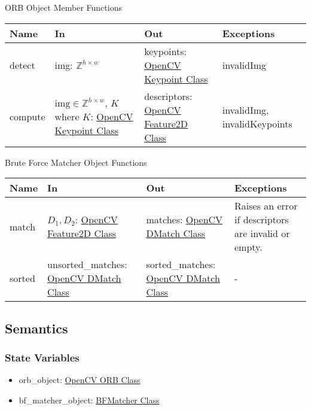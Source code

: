 \documentclass[12pt, titlepage]{article}
\begin{document}
ORB Object Member Functions
\begin{center}
\begin{tabular}{p{4cm} p{4cm} p{5cm} p{3cm}}
\hline
\textbf{Name} & \textbf{In} & \textbf{Out} & \textbf{Exceptions} \\
\hline
detect 
& img: $\mathbb{Z}^{h \times w}$ 
& keypoints: \href{https://docs.opencv.org/3.4/d2/d29/classcv_1_1KeyPoint.html}{OpenCV Keypoint Class} 
& invalidImg \\
\hline
compute & $\text{img} \in \mathbb{Z}^{h \times w}$, \newline 
$K$ where $K$: \href{https://docs.opencv.org/3.4/d2/d29/classcv_1_1KeyPoint.html}{OpenCV Keypoint Class} 
& descriptors: \href{https://docs.opencv.org/4.x/d0/d13/classcv_1_1Feature2D.html}{OpenCV Feature2D Class} 
& invalidImg, \newline 
invalidKeypoints \\
  \hline
  \end{tabular}
\end{center}
Brute Force Matcher Object Functions
\begin{center}
  \begin{tabular}{p{3cm} p{4cm} p{5cm} p{3cm}}
  \hline
  \textbf{Name} & \textbf{In} & \textbf{Out} & \textbf{Exceptions} \\
  \hline
  match & $D_1, D_2$: \href{https://docs.opencv.org/4.x/d0/d13/classcv_1_1Feature2D.html}{OpenCV Feature2D Class} 
  & matches: \href{https://docs.opencv.org/3.4/d4/de0/classcv_1_1DMatch.html}{OpenCV DMatch Class} 
  & Raises an error if descriptors are invalid or empty. \\
  \hline
  sorted 
  & unsorted\_matches: \href{https://docs.opencv.org/3.4/d4/de0/classcv_1_1DMatch.html}{OpenCV DMatch Class} 
  & sorted\_matches: \href{https://docs.opencv.org/3.4/d4/de0/classcv_1_1DMatch.html}{OpenCV DMatch Class} & - \\
  \hline
  \end{tabular}
\end{center}

\subsection{Semantics}

\subsubsection{State Variables}
\begin{itemize}
  \item orb\_object: \href{https://docs.opencv.org/3.4/db/d95/classcv_1_1ORB.html}{OpenCV ORB Class}
  \item bf\_matcher\_object: \href{https://docs.opencv.org/3.4/d3/da1/classcv_1_1BFMatcher.html}{BFMatcher Class}
  \end{itemize}
\end{document}
